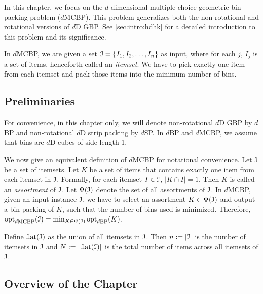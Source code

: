 In this chapter, we focus on the $d$-dimensional multiple-choice geometric
bin packing problem ($d$MCBP).
This problem generalizes both the non-rotational and rotational versions of $d$D GBP.
See \cref{sec:intro:hdhk} for a detailed introduction to this problem
and its significance.

In $d$MCBP, we are given a set $\mathcal{I} = \{I_1, I_2, \ldots, I_n\}$ as input,
where for each $j$, $I_j$ is a set of items, henceforth called an {\em itemset}.
We have to pick exactly one item from each itemset and pack those items
into the minimum number of bins.

\subsection*{Preliminaries}

For convenience, in this chapter only, we will denote non-rotational $d$D GBP by $d$BP
and non-rotational $d$D strip packing by $d$SP.
In $d$BP and $d$MCBP, we assume \wLoG{} that bins are $d$D cubes of side length 1.

We now give an equivalent definition of $d$MCBP for notational convenience.
Let $\mathcal{I}$ be a set of itemsets.
Let $K$ be a set of items that contains exactly one item from each itemset in $\mathcal{I}$.
Formally, for each itemset $I \in \mathcal{I}$, $|K \cap I| = 1$.
Then $K$ is called an \emph{assortment} of $\mathcal{I}$.
Let $\Psi(\mathcal{I})$ denote the set of all assortments of $\mathcal{I}$.
%
In $d$MCBP, given an input instance $\mathcal{I}$,
we have to select an assortment $K \in \Psi(\mathcal{I})$ and output a bin-packing of $K$,
such that the number of bins used is minimized. Therefore,
$\operatorname{opt}_{d\mathrm{MCBP}}(\mathcal{I}) = \min_{K \in \Psi(\mathcal{I})} \operatorname{opt}_{d\mathrm{BP}}(K)$.

Define $\operatorname{flat}(\mathcal{I})$ as the union of all itemsets in $\mathcal{I}$.
Then $n := |\mathcal{I}|$ is the number of itemsets in $\mathcal{I}$
and $N := |\operatorname{flat}(\mathcal{I})|$ is the total number of items across all itemsets of $\mathcal{I}$.

\subsection*{Overview of the Chapter}

